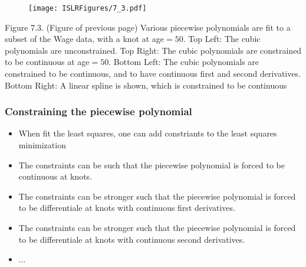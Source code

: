 \documentclass{beamer}
\begin{document}
               \begin{frame}
               	\frametitle{ }
               	\begin{figure}
               		\centering
               		
               		\centering
               		\texttt{[image: ISLRFigures/7\_3.pdf]}
               		
               	\end{figure}
               \end{frame}
               
                \begin{frame}
                	
               Figure 7.3. (Figure of previous page) Various piecewise polynomials are fit to a subset of the Wage
               	data, with a knot at age$=50$. Top Left: The cubic polynomials are unconstrained.
               	Top Right: The cubic polynomials are constrained to be continuous at age$=50$.
               	Bottom Left: The cubic polynomials are constrained to be continuous, and to
               	have continuous first and second derivatives. Bottom Right: A linear spline is
               	shown, which is constrained to be continuous
              
               \end{frame} 
               
               \begin{frame}
               	\frametitle{Constraining the piecewise polynomial}
               	\begin{itemize}
               		\item When fit the least squares, one can add constriants to 
               		the least squares minimization  
               		\item The constraints can be such that the piecewise polynomial is forced 
               		to be continuous at knots.
               		\item The constraints can be stronger such that the piecewise polynomial is forced 
               		to be differentiale at knots with continuous first derivatives. 
               		
               		\item The constraints can be stronger such that the piecewise polynomial is forced 
               		to be differentiale at knots with continuous second derivatives.
               		
               		 \item ...
               		
               	\end{itemize}
               \end{frame} 
               
\end{document}
